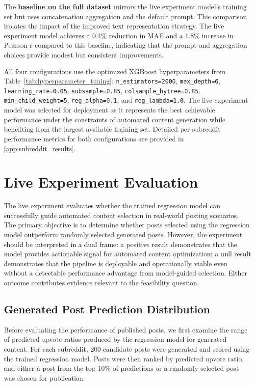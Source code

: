 The \textbf{baseline on the full dataset} mirrors the live experiment model's training set but uses concatenation aggregation and the default prompt. This comparison isolates the impact of the improved text representation strategy. The live experiment model achieves a 0.4\% reduction in MAE and a 1.8\% increase in Pearson r compared to this baseline, indicating that the prompt and aggregation choices provide modest but consistent improvements.

All four configurations use the optimized XGBoost hyperparameters from Table~\ref{tab:hyperparameter_tuning}: \texttt{n\_estimators=2000}, \texttt{max\_depth=6}, \texttt{learning\_rate=0.05}, \texttt{subsample=0.85}, \texttt{colsample\_bytree=0.85}, \texttt{min\_child\_weight=5}, \texttt{reg\_alpha=0.1}, and \texttt{reg\_lambda=1.0}. The live experiment model was selected for deployment as it represents the best achievable performance under the constraints of automated content generation while benefiting from the largest available training set. Detailed per-subreddit performance metrics for both configurations are provided in \autoref{app:subreddit_results}.

\section{Live Experiment Evaluation}

The live experiment evaluates whether the trained regression model can successfully guide automated content selection in real-world posting scenarios. The primary objective is to determine whether posts selected using the regression model outperform randomly selected generated posts. However, the experiment should be interpreted in a dual frame: a positive result demonstrates that the model provides actionable signal for automated content optimization; a null result demonstrates that the pipeline is deployable and operationally viable even without a detectable performance advantage from model-guided selection. Either outcome contributes evidence relevant to the feasibility question.

\subsection{Generated Post Prediction Distribution}

Before evaluating the performance of published posts, we first examine the range of predicted upvote ratios produced by the regression model for generated content. For each subreddit, 200 candidate posts were generated and scored using the trained regression model. Posts were then ranked by predicted upvote ratio, and either a post from the top 10\% of predictions or a randomly selected post was chosen for publication.

